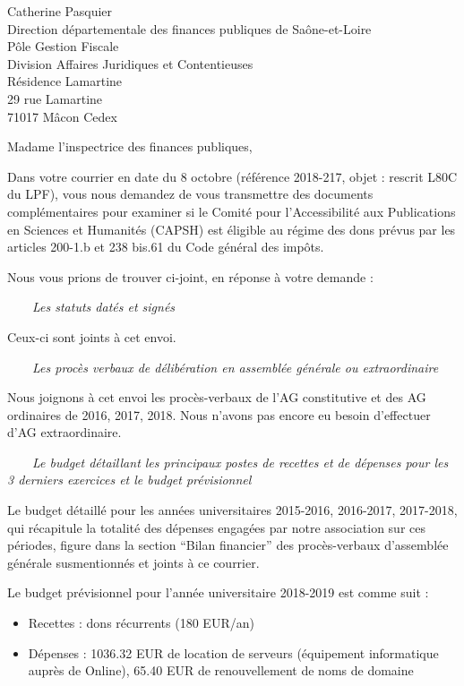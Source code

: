 \documentclass[11pt]{lettre}
\makeatletter
\newcommand*{\NoRule}{\renewcommand*{\rule@length}{0}}
\makeatother
\begin{document}
\begin{letter}{Catherine Pasquier\\Direction départementale des finances publiques de Saône-et-Loire\\Pôle Gestion Fiscale\\Division Affaires Juridiques et Contentieuses\\Résidence Lamartine\\29 rue Lamartine\\71017 Mâcon Cedex}
\NoRule
{}
\signature{}
\address{Antoine Amarilli (adresse omise)}
\nofax
{}
\telephone{}
\email{}
\opening{Madame l'inspectrice des finances publiques,}

Dans votre courrier en date du 8 octobre (référence 2018-217, objet : rescrit L80C du LPF), vous nous demandez de vous transmettre des documents complémentaires pour examiner si le Comité pour l'Accessibilité aux Publications en Sciences et Humanités (CAPSH) est éligible au régime des dons prévus par les articles 200-1.b et 238 bis.61 du Code général des impôts.

Nous vous prions de trouver ci-joint, en réponse à votre demande :
    
  ~~~~\emph{Les statuts datés et signés}
    
Ceux-ci sont joints à cet envoi.
    
     ~~~~\emph{Les procès verbaux de délibération en assemblée générale ou
     extraordinaire}

Nous joignons à cet envoi les procès-verbaux de l'AG constitutive et des AG
  ordinaires de 2016, 2017, 2018. Nous n'avons pas encore eu besoin d'effectuer
  d'AG extraordinaire.

    ~~~~\emph{Le budget détaillant les principaux postes de recettes et de
    dépenses pour les 3 derniers exercices et le budget prévisionnel}
    
Le budget détaillé pour les années universitaires 2015-2016, 2016-2017, 2017-2018, qui récapitule la totalité des dépenses engagées par notre association sur ces périodes, figure dans la section ``Bilan financier'' des procès-verbaux d'assemblée générale susmentionnés et joints à ce courrier.

Le budget prévisionnel pour l'année universitaire 2018-2019 est comme suit :
    
    \begin{itemize}
      \item Recettes : dons récurrents (180 EUR/an)
  \item Dépenses : 1036.32 EUR de location de serveurs (équipement informatique auprès de Online), 65.40 EUR de renouvellement de noms de domaine
    \end{itemize}


\end{letter}
\end{document}
